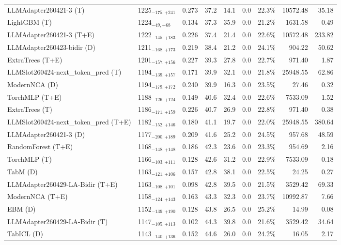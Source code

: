 \begin{tabular}{llcccccrr}
LLMAdapter260421-3 (T) & 1225${}_{-175,+241}$ & 0.273 & 37.2 & 14.1 & 0.0 & 22.3\% & 10572.48 & 35.18 \\
LightGBM (T) & 1224${}_{-49,+68}$ & 0.134 & 37.3 & 35.9 & 0.0 & 21.2\% & 1631.58 & 0.49 \\
LLMAdapter260421-3 (T+E) & 1222${}_{-145,+183}$ & 0.226 & 37.4 & 21.4 & 0.0 & 22.6\% & 10572.48 & 233.82 \\
LLMAdapter260423-bidir (D) & 1211${}_{-168,+173}$ & 0.219 & 38.4 & 21.2 & 0.0 & 24.1\% & 904.22 & 50.62 \\
ExtraTrees (T+E) & 1201${}_{-157,+156}$ & 0.227 & 39.3 & 27.8 & 0.0 & 22.7\% & 971.40 & 1.87 \\
LLMSlot260424-next_token_pred (T) & 1194${}_{-139,+157}$ & 0.171 & 39.9 & 32.1 & 0.0 & 21.8\% & 25948.55 & 62.86 \\
ModernNCA (D) & 1194${}_{-179,+172}$ & 0.240 & 39.9 & 16.3 & 0.0 & 23.5\% & 27.46 & 0.32 \\
TorchMLP (T+E) & 1188${}_{-126,+124}$ & 0.149 & 40.6 & 32.4 & 0.0 & 22.6\% & 7533.09 & 1.52 \\
ExtraTrees (T) & 1186${}_{-171,+159}$ & 0.226 & 40.7 & 26.9 & 0.0 & 22.8\% & 971.40 & 0.38 \\
LLMSlot260424-next_token_pred (T+E) & 1182${}_{-152,+146}$ & 0.180 & 41.1 & 19.7 & 0.0 & 22.0\% & 25948.55 & 380.64 \\
LLMAdapter260421-3 (D) & 1177${}_{-200,+189}$ & 0.209 & 41.6 & 25.2 & 0.0 & 24.5\% & 957.68 & 48.59 \\
RandomForest (T+E) & 1168${}_{-148,+148}$ & 0.186 & 42.3 & 23.6 & 0.0 & 23.3\% & 954.69 & 2.16 \\
TorchMLP (T) & 1166${}_{-103,+111}$ & 0.128 & 42.6 & 31.2 & 0.0 & 22.9\% & 7533.09 & 0.18 \\
TabM (D) & 1163${}_{-121,+106}$ & 0.157 & 42.8 & 38.1 & 0.0 & 22.5\% & 24.25 & 0.27 \\
LLMAdapter260429-LA-Bidir (T+E) & 1163${}_{-108,+101}$ & 0.098 & 42.8 & 39.5 & 0.0 & 21.5\% & 3529.42 & 69.33 \\
ModernNCA (T+E) & 1158${}_{-124,+143}$ & 0.163 & 43.3 & 32.3 & 0.0 & 23.7\% & 10992.87 & 7.66 \\
EBM (D) & 1152${}_{-139,+190}$ & 0.128 & 43.8 & 26.5 & 0.0 & 25.2\% & 14.99 & 0.08 \\
LLMAdapter260429-LA-Bidir (T) & 1147${}_{-105,+113}$ & 0.102 & 44.3 & 39.8 & 0.0 & 21.6\% & 3529.42 & 34.64 \\
TabICL (D) & 1143${}_{-140,+136}$ & 0.152 & 44.6 & 26.0 & 0.0 & 24.2\% & 16.05 & 2.17 \\

\end{tabular}

